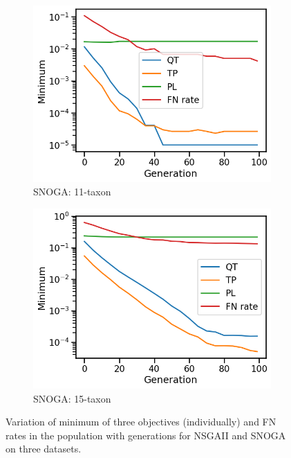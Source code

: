\begin{figure}[!h]
\begin{subfigure}[b]{0.33\textwidth}
			\includegraphics[width=\textwidth]{Figure/11-taxon_NOSSGA_minimum}
			\caption{SNOGA: 11-taxon}
\end{subfigure}\begin{subfigure}[b]{0.33\textwidth}
			\includegraphics[width=\textwidth]{Figure/15-taxon_NOSSGA_minimum}
			\caption{SNOGA: 15-taxon}
\end{subfigure}
		\caption{Variation of minimum of three objectives (individually) and FN rates in the population with generations for NSGAII and SNOGA on three datasets.	}
		\label{fig:gen_wise_min}
\end{figure}

